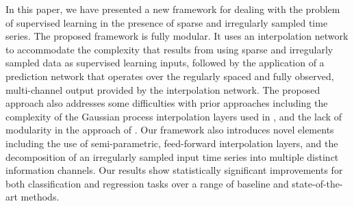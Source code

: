 \documentclass{article} \usepackage{iclr2019_conference,times}
\begin{document}
In this paper, we have presented a new framework for dealing with the
problem of supervised learning in the presence of sparse
and irregularly sampled time series. The proposed framework is fully
modular. It uses an interpolation network to accommodate the complexity
that results from using sparse and irregularly sampled data as
supervised learning inputs, followed by the application of 
a prediction network that operates over the regularly spaced and fully
observed, multi-channel output provided by the interpolation network.
The proposed approach also addresses some difficulties with prior 
approaches including the complexity of the Gaussian process
interpolation layers used in \citep{li2016scalable, futoma2017improved}, and 
the lack of modularity in the approach of \cite{che2016recurrent}.
Our framework also introduces novel elements including the
use of semi-parametric, feed-forward interpolation layers,
and the decomposition of an irregularly sampled 
input time series into multiple distinct information channels.
Our results show statistically significant improvements for both classification and regression tasks
 over a range of
baseline and state-of-the-art methods. 
\end{document}
